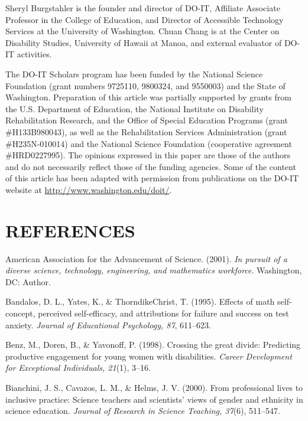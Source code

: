 \documentclass[11.5pt]{sig-alternate} %
\begin{document}
\begin{large}
 
Sheryl Burgstahler is the founder and director of DO-IT, Affiliate Associate Professor in the College of Education, and Director of Accessible Technology Services at the University of Washington. Chuan Chang is at the Center on Disability Studies, University of Hawaii at Manoa, and external evaluator of DO-IT activities. 
 
The DO-IT Scholars program has been funded by the National Science Foundation (grant numbers 9725110, 9800324, and 9550003) and the State of Washington. Preparation of this article was partially supported by grants from the U.S. Department of Education, the National Institute on Disability Rehabilitation Research, and the Office of Special Education Programs (grant \#H133B980043), as well as the Rehabilitation Services Administration (grant \#H235N-010014) and the National Science Foundation (cooperative agreement \#HRD0227995). The opinions expressed in this paper are those of the authors and do not necessarily reflect those of the funding agencies. Some of the content of this article has been adapted with permission from publications on the DO-IT website at \url{http://www.washington.edu/doit/}. 

\end{large}
 
\section*{REFERENCES}\par 

\leftskip 0.25in
\parindent -0.25in 

American Association for the Advancement of Science. (2001). \textit{In pursuit of a diverse science, technology, engineering, and mathematics workforce}. Washington, DC: Author. 
 
Bandalos, D. L., Yates, K., \& ThorndikeChrist, T. (1995). Effects of math self-concept, perceived self-efficacy, and attributions for failure and success on test anxiety. \textit{Journal of Educational Psychology, 87}, 611–623.  
 
Benz, M., Doren, B., \& Yavonoff, P. (1998). Crossing the great divide: Predicting productive engagement for young women with disabilities. \textit{Career Development for Exceptional Individuals, 21}(1), 3–16. 
 
Bianchini, J. S., Cavazos, L. M., \& Helms, J. V. (2000). From professional lives to inclusive practice: Science teachers and scientists' views of gender and ethnicity in science education. \textit{Journal of Research in Science Teaching, 37}(6), 511–547. 
 
\end{document}
